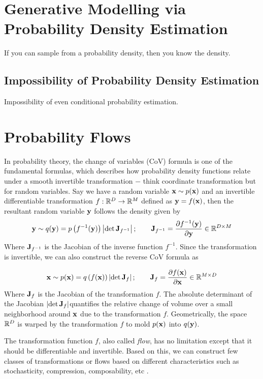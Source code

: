 \documentclass[a4paper, 11pt]{article}
\begin{document}
\section{Generative Modelling via Probability Density Estimation}

If you can sample from a probability density, then you know the density.

\subsection{Impossibility of Probability Density Estimation}
Impossibility of even conditional probability estimation.

\section{Probability Flows}
In probability theory, the change of variables (CoV) formula is one of the fundamental formulas, which describes how probability density functions relate under a smooth invertible transformation $-$ think coordinate transformation but for random variables. Say we have a random variable $\mbox{$\mbox{$\mathbf{x}$}$} \sim p(\mbox{$\mbox{$\mathbf{x}$}$})$ and an invertible differentiable transformation $f: \mathbb{R}^D \to \mathbb{R}^M$ defined as $\mbox{$\mbox{$\mathbf{y}$}$} = f(\mbox{$\mbox{$\mathbf{x}$}$})$, then the resultant random variable $\mbox{$\mbox{$\mathbf{y}$}$}$ follows the density given by
\begin{align}
    \mbox{$\mbox{$\mathbf{y}$}$} \sim q(\mbox{$\mbox{$\mathbf{y}$}$}) = p\left(f^{-1}(\mbox{$\mbox{$\mathbf{y}$}$}) \right)\left |\det \mbox{$\mbox{$\mathbf{J}$}$}_{f^{-1}} \right|; \qquad \mbox{$\mbox{$\mathbf{J}$}$}_{f^{-1}} = \frac{\partial f^{-1}(\mbox{$\mbox{$\mathbf{y}$}$})}{\partial \mbox{$\mbox{$\mathbf{y}$}$}} \in \mathbb{R}^{D \times M}
\end{align}
Where $\mbox{$\mbox{$\mathbf{J}$}$}_{f^{-1}}$ is the Jacobian of the inverse function $f^{-1}$. Since the transformation is invertible, we can also construct the reverse CoV formula as

\begin{align}
    \mbox{$\mbox{$\mathbf{x}$}$} \sim p(\mbox{$\mbox{$\mathbf{x}$}$}) = q\left(f(\mbox{$\mbox{$\mathbf{x}$}$}) \right)\left |\det \mbox{$\mbox{$\mathbf{J}$}$}_{f} \right|; \qquad \mbox{$\mbox{$\mathbf{J}$}$}_{f} = \frac{\partial f(\mbox{$\mbox{$\mathbf{x}$}$})}{\partial \mbox{$\mbox{$\mathbf{x}$}$}} \in \mathbb{R}^{M \times D}
\end{align}
Where $\mbox{$\mbox{$\mathbf{J}$}$}_{f}$ is the Jacobian of the transformation $f$. The absolute determinant of the Jacobian $\left |\det \mbox{$\mbox{$\mathbf{J}$}$}_{f} \right|$quantifies the relative change of volume over a small neighborhood around $\mbox{$\mbox{$\mathbf{x}$}$}$ due to the transformation $f$. Geometrically, the space $\mathbb{R}^D$ is warped by the transformation $f$ to mold $p(\mbox{$\mbox{$\mathbf{x}$}$})$ into $q(\mbox{$\mbox{$\mathbf{y}$}$})$.

The transformation function $f$, also called \emph{flow}, has no limitation except that it should be differentiable and invertible. Based on this, we can construct few classes of transformations or flows based on different characteristics such as stochasticity, compression, composability, etc \citep{kothe2023review}.
\end{document}
